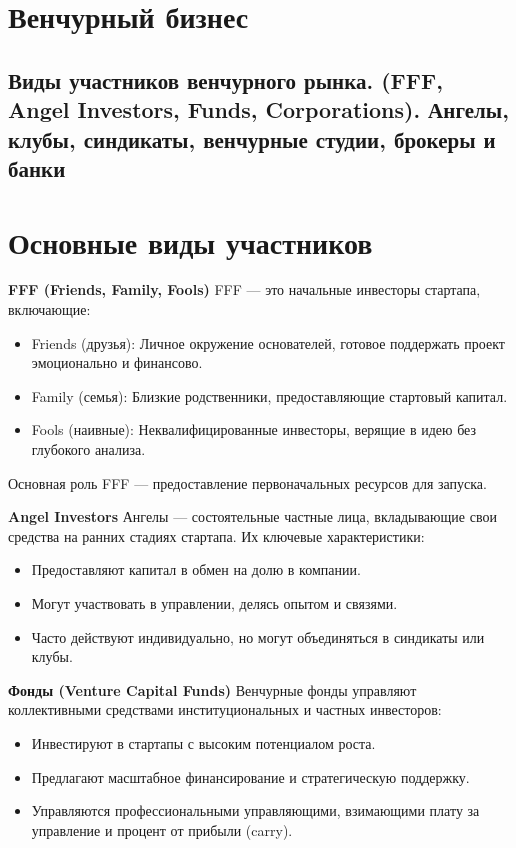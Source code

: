 \section{Венчурный бизнес}

\subsection{Виды участников венчурного рынка. (FFF, Angel Investors, Funds, Corporations). Ангелы, клубы, синдикаты, венчурные студии, брокеры и банки}

\section*{Основные виды участников}

\textbf{FFF (Friends, Family, Fools)}
FFF --- это начальные инвесторы стартапа, включающие:
\begin{itemize}
    \item Friends (друзья): Личное окружение основателей, готовое поддержать проект эмоционально и финансово.
    \item Family (семья): Близкие родственники, предоставляющие стартовый капитал.
    \item Fools (наивные): Неквалифицированные инвесторы, верящие в идею без глубокого анализа.
\end{itemize}
Основная роль FFF --- предоставление первоначальных ресурсов для запуска.

\textbf{Angel Investors}
Ангелы --- состоятельные частные лица, вкладывающие свои средства на ранних стадиях стартапа. Их ключевые характеристики:
\begin{itemize}
    \item Предоставляют капитал в обмен на долю в компании.
    \item Могут участвовать в управлении, делясь опытом и связями.
    \item Часто действуют индивидуально, но могут объединяться в синдикаты или клубы.
\end{itemize}

\textbf{Фонды (Venture Capital Funds)}
Венчурные фонды управляют коллективными средствами институциональных и частных инвесторов:
\begin{itemize}
    \item Инвестируют в стартапы с высоким потенциалом роста.
    \item Предлагают масштабное финансирование и стратегическую поддержку.
    \item Управляются профессиональными управляющими, взимающими плату за управление и процент от прибыли (carry).
\end{itemize}

